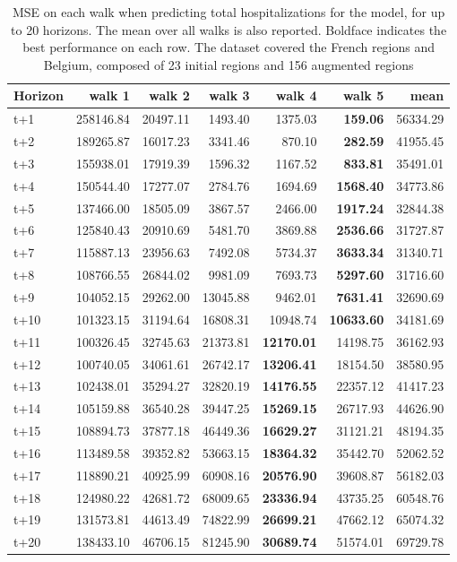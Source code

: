 \begin{table}[H]
\centering
\caption{MSE on each walk when predicting total hospitalizations for the model, for up to 20 horizons. The mean over all walks is also reported. Boldface indicates the best performance on each row. The dataset covered the French regions and Belgium, composed of 23 initial regions and 156 augmented regions }
\label{tab:MSE_walk_encoder_decoder}
\begin{tabular}{lrrrrrr}
\toprule
Horizon &    walk 1 &   walk 2 &   walk 3 &   walk 4 &   walk 5 &     mean \\
\midrule
t+1  & 258146.84  & 20497.11  & 1493.40  & 1375.03  & \textbf{159.06}  & 56334.29  \\
t+2  & 189265.87  & 16017.23  & 3341.46  & 870.10  & \textbf{282.59}  & 41955.45  \\
t+3  & 155938.01  & 17919.39  & 1596.32  & 1167.52  & \textbf{833.81}  & 35491.01  \\
t+4  & 150544.40  & 17277.07  & 2784.76  & 1694.69  & \textbf{1568.40}  & 34773.86  \\
t+5  & 137466.00  & 18505.09  & 3867.57  & 2466.00  & \textbf{1917.24}  & 32844.38  \\
t+6  & 125840.43  & 20910.69  & 5481.70  & 3869.88  & \textbf{2536.66}  & 31727.87  \\
t+7  & 115887.13  & 23956.63  & 7492.08  & 5734.37  & \textbf{3633.34}  & 31340.71  \\
t+8  & 108766.55  & 26844.02  & 9981.09  & 7693.73  & \textbf{5297.60}  & 31716.60  \\
t+9  & 104052.15  & 29262.00  & 13045.88  & 9462.01  & \textbf{7631.41}  & 32690.69  \\
t+10  & 101323.15  & 31194.64  & 16808.31  & 10948.74  & \textbf{10633.60}  & 34181.69  \\
t+11  & 100326.45  & 32745.63  & 21373.81  & \textbf{12170.01}  & 14198.75  & 36162.93  \\
t+12  & 100740.05  & 34061.61  & 26742.17  & \textbf{13206.41}  & 18154.50  & 38580.95  \\
t+13  & 102438.01  & 35294.27  & 32820.19  & \textbf{14176.55}  & 22357.12  & 41417.23  \\
t+14  & 105159.88  & 36540.28  & 39447.25  & \textbf{15269.15}  & 26717.93  & 44626.90  \\
t+15  & 108894.73  & 37877.18  & 46449.36  & \textbf{16629.27}  & 31121.21  & 48194.35  \\
t+16  & 113489.58  & 39352.82  & 53663.15  & \textbf{18364.32}  & 35442.70  & 52062.52  \\
t+17  & 118890.21  & 40925.99  & 60908.16  & \textbf{20576.90}  & 39608.87  & 56182.03  \\
t+18  & 124980.22  & 42681.72  & 68009.65  & \textbf{23336.94}  & 43735.25  & 60548.76  \\
t+19  & 131573.81  & 44613.49  & 74822.99  & \textbf{26699.21}  & 47662.12  & 65074.32  \\
t+20  & 138433.10  & 46706.15  & 81245.90  & \textbf{30689.74}  & 51574.01  & 69729.78  \\

\bottomrule
\end{tabular}
\end{table}
